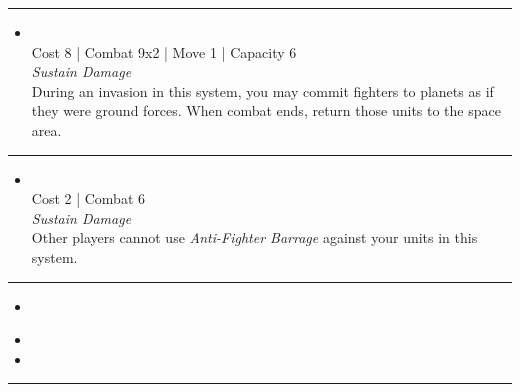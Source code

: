 \begin{multicols}{2}
\vspace{-10pt}\rule{\hsize}{0.4pt}\vspace{5pt}


\begin{itemize}
\item {}\\
Cost 8 | Combat 9x2 | Move 1 | Capacity 6 \\
\emph{Sustain Damage}\\
During an invasion in this system, you may commit fighters to planets as if they were ground forces. When combat ends, return those units to the space area.
\end{itemize}

\vspace{-10pt}\rule{\hsize}{0.4pt}\vspace{5pt}


\begin{itemize}
\item {}
\\
Cost 2 | Combat 6 \\
\emph{Sustain Damage}\\
Other players cannot use \emph{Anti-Fighter Barrage} against your units in this system.
\end{itemize}

\vspace{-10pt}\rule{\hsize}{0.4pt}\vspace{5pt}


\begin{itemize}
\item \crystalFighterI
\end{itemize}

\columnbreak
{}

\begin{itemize}
\item \crystalFighterII
\item \neuroglaive
\end{itemize}

\vspace{-10pt}\rule{\hsize}{0.4pt}\vspace{5pt}



\end{multicols}

